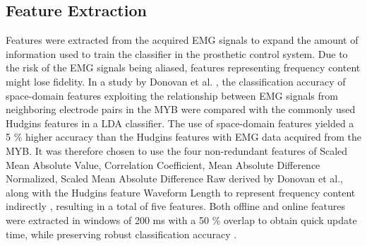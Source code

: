 \subsection{Feature Extraction}
Features were extracted from the acquired EMG signals to expand the amount of information used to train the classifier in the prosthetic control system. Due to the risk of the EMG signals being aliased, features representing frequency content might lose fidelity. In a study by Donovan et al. \cite{Donovan2017}, the classification accuracy of space-domain features exploiting the relationship between EMG signals from neighboring electrode pairs in the MYB were compared with the commonly used Hudgins features in a LDA classifier. The use of space-domain features yielded a 5 $\%$ higher accuracy than the Hudgins features with EMG data acquired from the MYB. It was therefore chosen to use the four non-redundant features of Scaled Mean Absolute Value, Correlation Coefficient, Mean Absolute Difference Normalized, Scaled Mean Absolute Difference Raw derived by Donovan et al., along with the Hudgins feature Waveform Length to represent frequency content indirectly \cite{Hudgins1993}, resulting in a total of five features. Both offline and online features were extracted in windows of 200 ms with a 50 $\%$ overlap to obtain quick update time, while preserving robust classification accuracy \cite{Menon2017}. 
